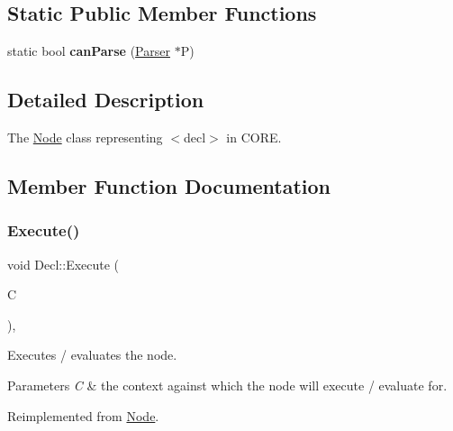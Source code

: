 \subsection*{Static Public Member Functions}
\begin{DoxyCompactItemize}
\item 
\mbox{\label{class_decl_a4399a127e04d2b01ee23bb2d9726c9dc}} 
static bool {\bfseries can\+Parse} (\mbox{\hyperlink{class_parser}{Parser}} $\ast$P)
\end{DoxyCompactItemize}


\subsection{Detailed Description}
The \mbox{\hyperlink{class_node}{Node}} class representing {\ttfamily $<$decl$>$} in C\+O\+RE. 

\subsection{Member Function Documentation}
\mbox{\label{class_decl_a6ac3129b12248807b15edc3377cb448f}} 
\subsubsection{\texorpdfstring{Execute()}{Execute()}}
{\footnotesize\ttfamily void Decl\+::\+Execute (\begin{DoxyParamCaption}\item[{\mbox{\hyperlink{class_a_s_t_context}{A\+S\+T\+Context}} \&}]{C }\end{DoxyParamCaption})\hspace{0.3cm}{\ttfamily [override]}, {\ttfamily [virtual]}}

Executes / evaluates the node. 
\begin{DoxyParams}{Parameters}
{\em C} & the context against which the node will execute / evaluate for. \\
\hline
\end{DoxyParams}


Reimplemented from \mbox{\hyperlink{class_node_a27ad1ba81d2596817b361368282bcbfa}{Node}}.

\mbox{\label{class_decl_a2cd337f551b0a66d6787816c0a4a907a}} 
